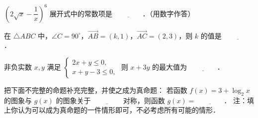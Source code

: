 \begin{question}
$\left(2\sqrt{x} - \dfrac{1}{x}\right)^6$ 展开式中的常数项是 $\underline{\qquad\qquad}$．（用数字作答）

\end{question}
\begin{question}
在 $\triangle ABC$ 中，$\angle C = 90^\circ$，$\overrightarrow{AB} = (k, 1)$，$\overrightarrow{AC} = (2, 3)$，则 $k$ 的值是 $\underline{\qquad\qquad}$．

\end{question}
\begin{question}
非负实数 $x, y$ 满足 $\begin{cases} 2x + y \leqslant 0, \\ x + y - 3 \leqslant 0, \end{cases}$ 则 $x + 3y$ 的最大值为 $\underline{\qquad\qquad}$．

\end{question}
\begin{question}
把下面不完整的命题补充完整，并使之成为真命题：
若函数 $f(x) = 3 + \log_2 x$ 的图象与 $g(x)$ 的图象关于 $\underline{\qquad\qquad}$ 对称，则函数 $g(x) = \underline{\qquad\qquad}$．
注：填上你认为可以成为真命题的一件情形即可，不必考虑所有可能的情形．

\end{question}

